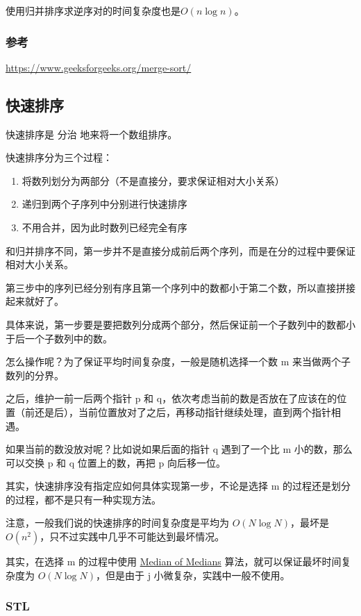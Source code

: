 使用归并排序求逆序对的时间复杂度也是$O(n \log n)$。

\subsubsection{参考}

\url{https://www.geeksforgeeks.org/merge-sort/}

\subsection{快速排序}

快速排序是  分治  地来将一个数组排序。

快速排序分为三个过程：

\begin{enumerate}
\item 将数列划分为两部分（不是直接分，要求保证相对大小关系）
\item 递归到两个子序列中分别进行快速排序
\item 不用合并，因为此时数列已经完全有序
\end{enumerate}

和归并排序不同，第一步并不是直接分成前后两个序列，而是在分的过程中要保证相对大小关系。

第三步中的序列已经分别有序且第一个序列中的数都小于第二个数，所以直接拼接起来就好了。

具体来说，第一步要是要把数列分成两个部分，然后保证前一个子数列中的数都小于后一个子数列中的数。

怎么操作呢？为了保证平均时间复杂度，一般是随机选择一个数 m 来当做两个子数列的分界。

之后，维护一前一后两个指针 p 和 q，依次考虑当前的数是否放在了应该在的位置（前还是后），当前位置放对了之后，再移动指针继续处理，直到两个指针相遇。

如果当前的数没放对呢？比如说如果后面的指针 q 遇到了一个比 m 小的数，那么可以交换 p 和 q 位置上的数，再把 p 向后移一位。

其实，快速排序没有指定应如何具体实现第一步，不论是选择 m 的过程还是划分的过程，都不是只有一种实现方法。

注意，一般我们说的快速排序的时间复杂度是平均为 $O(N\log N)$，最坏是 $O(n^2)$，只不过实践中几乎不可能达到最坏情况。

其实，在选择 m 的过程中使用 \href{https://en.wikipedia.org/wiki/Median_of_medians}{Median of Medians} 算法，就可以保证最坏时间复杂度为 $O(N\log N)$，但是由于 j 小微复杂，实践中一般不使用。

\subsubsection{STL}

